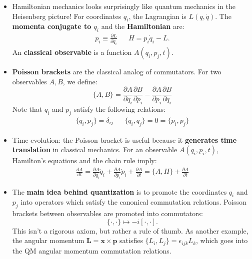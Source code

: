 \documentclass[12pt, oneside]{article}   	%
\theoremstyle{definition}
\begin{document}
\begin{itemize}

	\item Hamiltonian mechanics looks surprisingly like quantum mechanics in the Heisenberg picture! For coordinates $q_i$, the Lagrangian is $L(q, \dot q)$. The \textbf{momenta conjugate to $q_i$} and the \textbf{Hamiltonian} are:
	\begin{align}
		p_i\equiv \frac{\partial L}{\partial \dot q_i} && H = p_i \dot q_i - L.
	\end{align}
	An \textbf{classical observable} is a function $A(q_i, p_j, t)$. 
	
	\item \textbf{Poisson brackets} are the classical analog of commutators. For two observables $A, B$, we define:
	\begin{equation}
		\{A, B\} = \frac{\partial A}{\partial q_i} \frac{\partial B}{\partial p_i} - \frac{\partial A}{\partial p_i} \frac{\partial B}{\partial q_i}
	\end{equation}
	Note that $q_i$ and $p_j$ satisfy the following relations:
	\begin{align}
		\{q_i, p_j\} = \delta_{ij} && \{q_i, q_j\} = 0 = \{p_i, p_j\}
	\end{align}
	
	\item Time evolution: the Poisson bracket is useful because it \textbf{generates time translation} in classical mechanics. For an observable $A(q_i, p_i, t)$, Hamilton's equations and the chain rule imply:
	\begin{align}
		\frac{dA}{dt} = \frac{\partial A}{\partial q_i} \dot q_i + \frac{\partial A}{\partial p_i} \dot p_i + \frac{\partial A}{\partial t} = \{A, H\} + \frac{\partial A}{\partial t}
	\end{align}
	
	\item The \textbf{main idea behind quantization} is to promote the coordinates $q_i$ and $p_j$ into operators which satisfy the canonical commutation relations. Poisson brackets between observables are promoted into commutators:
	\begin{equation}
		\{\cdot, \cdot\}\mapsto -i [\cdot, \cdot].
	\end{equation}
	This isn't a rigorous axiom, but rather a rule of thumb. As another example, the angular momentum $\bm L = \bm x \times \bm p$ satisfies $\{L_i, L_j\} = \epsilon_{ijk} L_k$, which goes into the QM angular momentum commutation relations.
	

\end{itemize}
\end{document}
